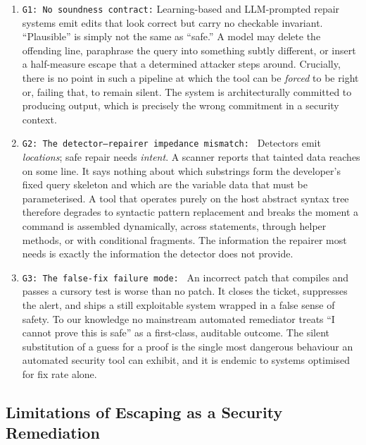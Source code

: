 \begin{enumerate}


\item \texttt{G1: No soundness contract:}
Learning-based and LLM-prompted repair systems emit edits that look correct
but carry no checkable invariant. ``Plausible'' is simply not the same as
``safe.'' A model may delete the offending line, paraphrase the query into
something subtly different, or insert a half-measure escape that a
determined attacker steps around. Crucially, there is no point in such a
pipeline at which the tool can be \emph{forced} to be right or, failing
that, to remain silent. The system is architecturally committed to
producing output, which is precisely the wrong commitment in a security
context.

\item \texttt{G2: The detector--repairer impedance mismatch: }
Detectors emit \emph{locations}; safe repair needs \emph{intent}. A scanner
reports that tainted data reaches  on some line. It says
nothing about which substrings form the developer's fixed query skeleton and
which are the variable data that must be parameterised. A tool that operates
purely on the host abstract syntax tree therefore degrades to syntactic
pattern replacement and breaks the moment a command is assembled
dynamically, across statements, through helper methods, or with conditional
fragments. The information the repairer most needs is exactly the
information the detector does not provide.

\item \texttt{G3: The false-fix failure mode: }
An incorrect patch that compiles and passes a cursory test is worse than no
patch. It closes the ticket, suppresses the alert, and ships a still
exploitable system wrapped in a false sense of safety. To our knowledge no
mainstream automated remediator treats ``I cannot prove this is safe'' as a
first-class, auditable outcome. The silent substitution of a guess for a
proof is the single most dangerous behaviour an automated security tool can
exhibit, and it is endemic to systems optimised for fix rate alone.
     
\end{enumerate}


\subsection{Limitations of Escaping as a Security Remediation}
\label{sec:escaping}

